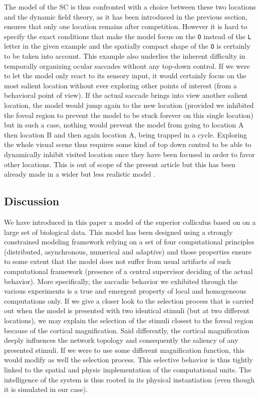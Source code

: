 The model of the SC is thus confronted with a choice between these two
locations and the dynamic field theory, as it has been introduced in the
previous section, ensures that only one location remains after
competition. However it is hard to specify the exact conditions that make the
model focus on the {\tt O} instead of the {\tt L} letter in the given
example and the spatially compact shape of the {\tt O} is certainly to be taken
into account. This example also underlies the inherent difficulty in temporally
organizing ocular saccades without any top-down control. If we were to let the
model only react to its sensory input, it would certainly focus on the most
salient location without ever exploring other points of interest (from a
behavioral point of view). If the actual saccade brings into view another
salient location, the model would jump again to the new location (provided we
inhibited the foveal region to prevent the model to be stuck forever on this
single location) but in such a case, nothing would prevent the model from going
to location A then location B and then again location A, being trapped in a
cycle. Exploring the whole visual scene thus requires some kind of top down
control to be able to dynamically inhibit visited location once they have been
focused in order to favor other locations. This is out of scope of the present
article but this has been already made in a wider but less realistic model
\cite{Fix:2006}.



\subsection{Discussion}
We have introduced in this paper a model of the superior colliculus based on on
a large set of biological data. This model has been designed using a strongly
constrained modeling framework relying on a set of four computational
principles (distributed, asynchronous, numerical and adaptive) and those
properties ensure to some extent that the model does not suffer from usual
artifacts of such computational framework (presence of a central supervisor
deciding of the actual behavior). More specifically, the saccadic behavior we
exhibited through the various experiments is a true and emergent property of
local and homogeneous computations only. If we give a closer look to the
selection process that is carried out when the model is presented with two
identical stimuli (but at two different locations), we may explain the
selection of the stimuli closest to the foveal region because of the cortical
magnification. Said differently, the cortical magnification deeply influences
the network topology and consequently the saliency of any presented stimuli. If
we were to use some different magnification function, this would modify as well
the selection process. This selective behavior is thus tightly linked to the
spatial and physic implementation of the computational units. The intelligence
of the system is thus rooted in its physical instantiation (even though it is
simulated in our case).\\

